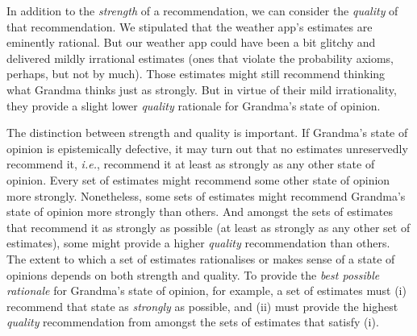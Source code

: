 In addition to the \textit{strength} of a recommendation, we can consider the \textit{quality} of that recommendation. We stipulated that the weather app's estimates are eminently rational. But our weather app could have been a bit glitchy and delivered mildly irrational estimates (ones that violate the probability axioms, perhaps, but not by much). Those estimates might still recommend thinking what Grandma thinks just as strongly. But in virtue of their mild irrationality, they provide a slight lower \textit{quality} rationale for Grandma's state of opinion.

The distinction between strength and quality is important. If Grandma's state of opinion is epistemically defective, it may turn out that no estimates unreservedly recommend it, \textit{i.e.}, recommend it at least as strongly as any other state of opinion. Every set of estimates might recommend some other state of opinion more strongly. Nonetheless, some sets of estimates might recommend Grandma's state of opinion more strongly than others. And amongst the sets of estimates that recommend it as strongly as possible (at least as strongly as any other set of estimates), some might provide a higher \textit{quality} recommendation than others. The extent to which a set of estimates rationalises or makes sense of a state of opinions depends on both strength and quality. To provide the \textit{best possible rationale} for Grandma's state of opinion, for example, a set of estimates must (i) recommend that state as \textit{strongly} as possible, and (ii) must provide the highest \textit{quality} recommendation from amongst the sets of estimates that satisfy (i).


